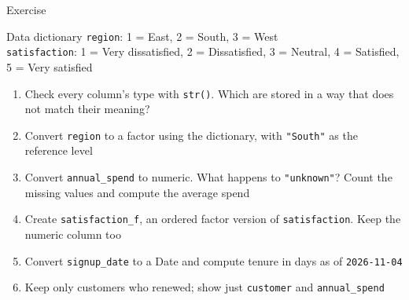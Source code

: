 \documentclass[
  ignorenonframetext,
  aspectratio=169,
]{beamer}
\providecommand{\tightlist}{%
  \setlength{\itemsep}{0pt}\setlength{\parskip}{0pt}}\usepackage{longtable,booktabs,array}
\begin{document}
\begin{frame}[fragile]{Exercise}
\protect\hypertarget{exercise}{}
\begin{exampleblock}{Data dictionary}
\protect\hypertarget{data-dictionary}{}
\texttt{region}: 1 = East, 2 = South, 3 = West\\
\texttt{satisfaction}: 1 = Very dissatisfied, 2 = Dissatisfied, 3 =
Neutral, 4 = Satisfied, 5 = Very satisfied

\begin{enumerate}
\tightlist
\item
  Check every column's type with \texttt{str()}. Which are stored in a
  way that does not match their meaning?
\item
  Convert \texttt{region} to a factor using the dictionary, with
  \texttt{"South"} as the reference level
\item
  Convert \texttt{annual\_spend} to numeric. What happens to
  \texttt{"unknown"}? Count the missing values and compute the average
  spend
\item
  Create \texttt{satisfaction\_f}, an ordered factor version of
  \texttt{satisfaction}. Keep the numeric column too
\item
  Convert \texttt{signup\_date} to a Date and compute tenure in days as
  of \texttt{2026-11-04}
\item
  Keep only customers who renewed; show just \texttt{customer} and
  \texttt{annual\_spend}
\end{enumerate}
\end{exampleblock}
\end{frame}
\end{document}
